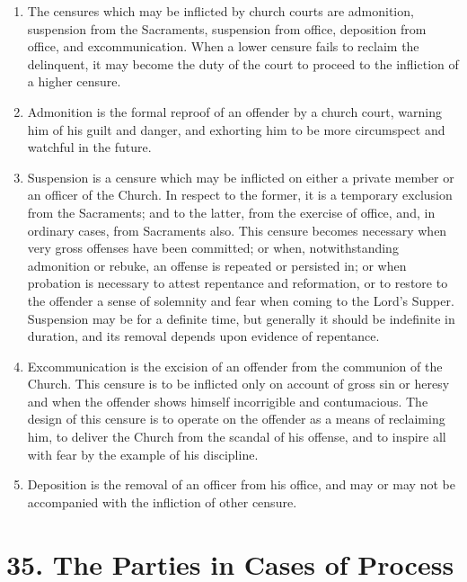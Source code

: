 \documentclass[
]{book}
\providecommand{\tightlist}{%
  \setlength{\itemsep}{0pt}\setlength{\parskip}{0pt}}
\begin{document}
\begin{enumerate}
\def\labelenumi{\arabic{enumi}.}
\tightlist
\item
  \protect\hypertarget{34}{\href{}{}}The censures which may be inflicted by church courts are admonition, suspension from the Sacraments, suspension from office, deposition from office, and excommunication. When a lower censure fails to reclaim the delinquent, it may become the duty of the court to proceed to the infliction of a higher censure.
\item
  Admonition is the formal reproof of an offender by a church court, warning him of his guilt and danger, and exhorting him to be more circumspect and watchful in the future.
\item
  Suspension is a censure which may be inflicted on either a private member or an officer of the Church. In respect to the former, it is a temporary exclusion from the Sacraments; and to the latter, from the exercise of office, and, in ordinary cases, from Sacraments also. This censure becomes necessary when very gross offenses have been committed; or when, notwithstanding admonition or rebuke, an offense is repeated or persisted in; or when probation is necessary to attest repentance and reformation, or to restore to the offender a sense of solemnity and fear when coming to the Lord's Supper. Suspension may be for a definite time, but generally it should be indefinite in duration, and its removal depends upon evidence of repentance.
\item
  Excommunication is the excision of an offender from the communion of the Church. This censure is to be inflicted only on account of gross sin or heresy and when the offender shows himself incorrigible and contumacious. The design of this censure is to operate on the offender as a means of reclaiming him, to deliver the Church from the scandal of his offense, and to inspire all with fear by the example of his discipline.
\item
  Deposition is the removal of an officer from his office, and may or may not be accompanied with the infliction of other censure.
\end{enumerate}

\hypertarget{the-parties-in-cases-of-process}{%
\section*{35. The Parties in Cases of Process}\label{the-parties-in-cases-of-process}}
\end{document}
